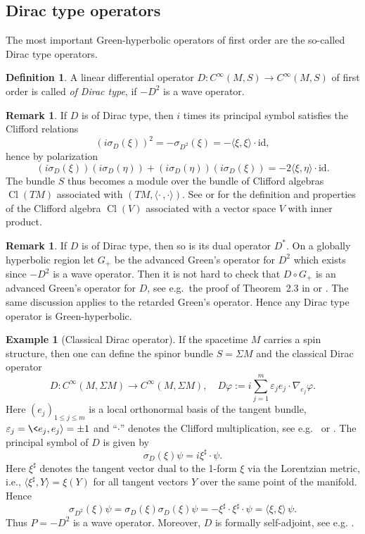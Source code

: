 \documentclass[a4paper,11pt]{amsart}
\theoremstyle{definition}
\newtheorem{ex}[thm]{Example}
\newtheorem{rem}[thm]{Remark}
\newtheorem{definition}[thm]{Definition}
\begin{document}
\subsection{Dirac type operators}\label{s:Diractype}
The most important Green-hyperbolic operators of first order are the so-called Dirac type operators.

\begin{definition}
A linear differential operator $D:{C^\infty}(M,S) \to {C^\infty}(M,S)$ of first order is called {\em of Dirac type}, if $-D^2$ is a wave operator.
\end{definition}

\begin{rem}
If $D$ is of Dirac type, then $i$ times its principal symbol satisfies the Clifford relations
$$
(i\sigma_D(\xi))^2 = -\sigma_{D^2}(\xi) = -{\langle}\xi,\xi{\rangle}\cdot{\mathrm{id}} ,
$$
hence by polarization
$$
(i\sigma_D(\xi))(i\sigma_D(\eta)) + (i\sigma_D(\eta))(i\sigma_D(\xi)) = -2{\langle}\xi,\eta{\rangle}\cdot{\mathrm{id}} .
$$
The bundle $S$ thus becomes a module over the bundle of Clifford algebras ${\operatorname{Cl}}(TM)$ associated with $(TM,{\langle}\cdot\,,\cdot{\rangle})$.
See \cite[Sec.~1.1]{Baum} or \cite[Ch.~I]{LM} for the definition and properties of the Clifford algebra ${\operatorname{Cl}}(V)$ associated with a vector space $V$ with inner product.
\end{rem}

\begin{rem}
If $D$ is of Dirac type, then so is its dual operator $D^*$.
On a globally hyperbolic region let $G_+$ be the advanced Green's operator for $D^2$ which exists since $-D^2$ is a wave operator.
Then it is not hard to check that $D\circ G_+$ is an advanced Green's operator for $D$, see e.g.\ the proof of Theorem~2.3 in \cite{DHP} or \cite[Thm.~3.2]{Mue}.
The same discussion applies to the retarded Green's operator.
Hence any Dirac type operator is Green-hyperbolic.
\end{rem}

\begin{ex}[Classical Dirac operator]\label{ex:spinors}
If the spacetime $M$ carries a spin structure, then one can define the spinor bundle $S=\Sigma M$ and the classical Dirac operator
$$
D : {C^\infty}(M,\Sigma M) \to {C^\infty}(M,\Sigma M) ,\quad D{\varphi}:=i\sum_{j=1}^m{\varepsilon}_j e_j\cdot{\nabla}_{e_j}{\varphi} .
$$
Here $(e_j)_{1\leq j\leq m}$ is a local orthonormal basis of the tangent bundle, ${\varepsilon}_j=\<e_j,e_j{\rangle}=\pm 1$ and ``$\cdot$'' denotes the Clifford multiplication, see e.g.\ \cite{Baum} or \cite[Sec.~2]{BGM}.
The principal symbol of $D$ is given by 
$$
\sigma_D(\xi)\psi = i\xi^\sharp \cdot \psi.
$$
Here $\xi^\sharp$ denotes the tangent vector dual to the 1-form $\xi$ via the Lorentzian metric, i.e., ${\langle}\xi^\sharp,Y{\rangle} = \xi(Y)$ for all tangent vectors $Y$ over the same point of the manifold.
Hence
$$
\sigma_{D^2}(\xi)\psi = \sigma_D(\xi)\sigma_D(\xi)\psi = -\xi^\sharp \cdot
\xi^\sharp \cdot \psi = {\langle}\xi,\xi{\rangle}\,\psi.
$$
Thus $P=-D^2$ is a wave operator.
Moreover, $D$ is formally self-adjoint, see e.g. \cite[p.~552]{BGM}.
\end{ex}
\end{document}
